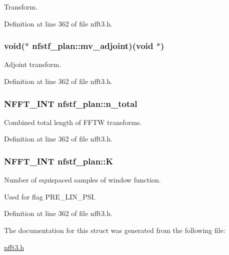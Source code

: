 Transform. 



Definition at line 362 of file nfft3.\-h.

\hypertarget{structnfstf__plan_a604a83ef64c291c6f8b23d45f620f2c7}{
\subsubsection[{mv\-\_\-adjoint}]{\setlength{\rightskip}{0pt plus 5cm}void($\ast$ nfstf\-\_\-plan\-::mv\-\_\-adjoint)(void $\ast$)}}\label{structnfstf__plan_a604a83ef64c291c6f8b23d45f620f2c7}


Adjoint transform. 



Definition at line 362 of file nfft3.\-h.

\hypertarget{structnfstf__plan_a983d3aaa791b1bdb66e35d78e1c6b7ef}{
\subsubsection[{n\-\_\-total}]{\setlength{\rightskip}{0pt plus 5cm}N\-F\-F\-T\-\_\-\-I\-N\-T nfstf\-\_\-plan\-::n\-\_\-total}}\label{structnfstf__plan_a983d3aaa791b1bdb66e35d78e1c6b7ef}


Combined total length of F\-F\-T\-W transforms. 



Definition at line 362 of file nfft3.\-h.

\hypertarget{structnfstf__plan_a4a4c81d83b870102d5c6ee913d64924a}{
\subsubsection[{K}]{\setlength{\rightskip}{0pt plus 5cm}N\-F\-F\-T\-\_\-\-I\-N\-T nfstf\-\_\-plan\-::\-K}}\label{structnfstf__plan_a4a4c81d83b870102d5c6ee913d64924a}


Number of equispaced samples of window function. 

Used for flag P\-R\-E\-\_\-\-L\-I\-N\-\_\-\-P\-S\-I. 

Definition at line 362 of file nfft3.\-h.



The documentation for this struct was generated from the following file\-:\begin{DoxyCompactItemize}
\item 
\hyperlink{nfft3_8h}{nfft3.\-h}\end{DoxyCompactItemize}

